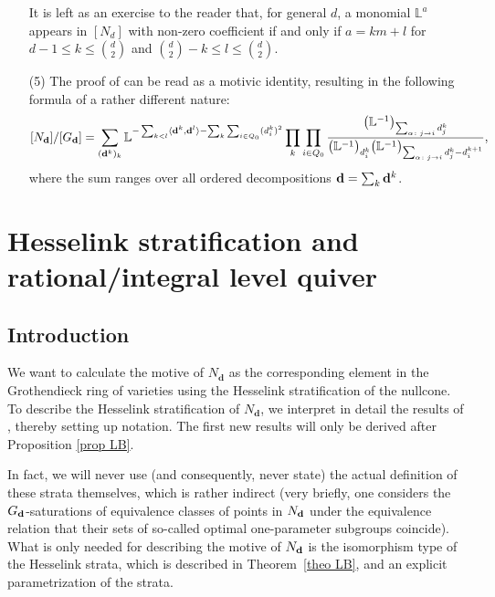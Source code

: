 \documentclass[pdftex]{sigma}
\numberwithin{equation}{section}
\theoremstyle{definition}
\begin{document}
\begin{enumerate}
It is left as an exercise to the reader that, for general $d$, a monomial $\mathbb{L}^a$ appears in $[N_d]$ with non-zero coefficient if and only if $a=km+l$ for $d-1\leq k\leq{d\choose 2}$ and ${d\choose 2}-k\leq l\leq{d\choose 2}$.
\item[(5)] The proof of \cite[Lemma~2.6]{BSV} can be read as a motivic identity, resulting in the following formula of a rather different nature:
\[[N_{\bf d}]/[G_{\bf d}]=\sum_{({\bf d}^k)_k}\mathbb{L}^{-\sum_{k<l}\langle{\bf d}^k,{\bf d}^l\rangle-\sum_k\sum_{i\in Q_0}(d^k_i)^2}\prod_k\prod_{i\in Q_0}\frac{\bigl(\mathbb{L}^{-1}\bigr)_{\sum_{\alpha\colon j\rightarrow i}d^k_j}}{\bigl(\mathbb{L}^{-1}\bigr)_{d^k_i}\bigl(\mathbb{L}^{-1}\bigr)_{\sum_{\alpha\colon j\rightarrow i}d^k_j-d^{k+1}_i}},\]
where the sum ranges over all ordered decompositions ${\bf d}=\sum_k{\bf d}^k$.
\end{enumerate}


\section{Hesselink stratification and rational/integral level quiver}\label{s4}


\subsection{Introduction}

We want to calculate the motive of $N_{\mathbf{d}}$ as the corresponding element in the Grothendieck ring of varieties using the Hesselink stratification of the nullcone. To describe the Hesselink stratification of $N_{\mathbf{d}}$, we interpret in detail the results of \cite{LB}, thereby setting up notation. The first new results will only be derived after Proposition \ref{prop LB}.

In fact, we will never use (and consequently, never state) the actual definition of these strata themselves, which is rather indirect (very briefly, one considers the $G_{\bf d}$-saturations of equivalence classes of points in $N_{\bf d}$ under the equivalence relation that their sets of so-called optimal one-parameter subgroups coincide). What is only needed for describing the motive of $N_{\bf d}$ is the isomorphism type of the Hesselink strata, which is described in Theorem~\ref{theo LB}, and an explicit parametrization of the strata.
\end{document}
